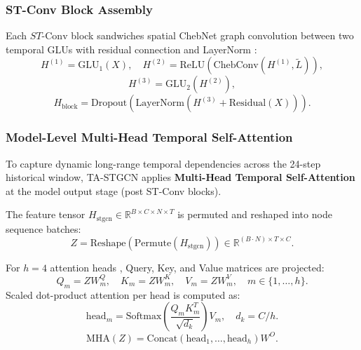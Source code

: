 \subsubsection{ST-Conv Block Assembly}
Each $ST\text{-Conv}$ block sandwiches spatial ChebNet graph convolution between two temporal GLUs with residual connection and LayerNorm \cite{stgcn}:
\begin{equation}
H^{(1)} = \text{GLU}_1(X), \quad H^{(2)} = \text{ReLU}\left( \text{ChebConv}\left(H^{(1)}, \tilde{L}\right) \right),
\end{equation}
\begin{equation}
H^{(3)} = \text{GLU}_2\left(H^{(2)}\right),
\end{equation}
\begin{equation}
H_{\text{block}} = \text{Dropout}\left( \text{LayerNorm}\left( H^{(3)} + \text{Residual}(X) \right) \right).
\end{equation}

\subsubsection{Model-Level Multi-Head Temporal Self-Attention}
To capture dynamic long-range temporal dependencies across the 24-step historical window, TA-STGCN applies \textbf{Multi-Head Temporal Self-Attention} \cite{attention} at the model output stage (post ST-Conv blocks).

The feature tensor $H_{\text{stgcn}} \in \mathbb{R}^{B \times C \times N \times T}$ is permuted and reshaped into node sequence batches:
\begin{equation}
Z = \text{Reshape}\left(\text{Permute}(H_{\text{stgcn}})\right) \in \mathbb{R}^{(B \cdot N) \times T \times C}.
\end{equation}

For $h=4$ attention heads \cite{attention}, Query, Key, and Value matrices are projected:
\begin{equation}
Q_m = Z W_m^Q, \quad K_m = Z W_m^K, \quad V_m = Z W_m^V, \quad m \in \{1, \dots, h\}.
\end{equation}
Scaled dot-product attention per head is computed as:
\begin{equation}
\text{head}_m = \text{Softmax}\left( \frac{Q_m K_m^T}{\sqrt{d_k}} \right) V_m, \quad d_k = C / h.
\end{equation}
\begin{equation}
\text{MHA}(Z) = \text{Concat}(\text{head}_1, \dots, \text{head}_h) W^O.
\end{equation}

